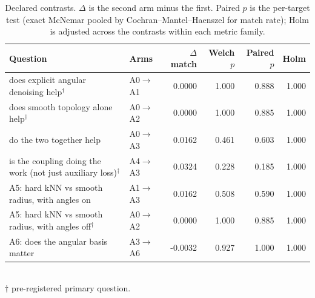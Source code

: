 \begin{table}[htbp]
\centering
\small
\caption{Declared contrasts. $\Delta$ is the second arm minus the first. Paired $p$ is the per-target test (exact McNemar pooled by Cochran--Mantel--Haenszel for match rate); Holm is adjusted across the contrasts within each metric family.}
\begin{tabular}{llrrrr}
\toprule
Question & Arms & $\Delta$ match & Welch $p$ & Paired $p$ & Holm \\
\midrule
does explicit angular denoising help$^{\dagger}$ & A0$\to$A1 & 0.0000 & 1.000 & 0.888 & 1.000 \\
does smooth topology alone help$^{\dagger}$ & A0$\to$A2 & 0.0000 & 1.000 & 0.885 & 1.000 \\
do the two together help & A0$\to$A3 & 0.0162 & 0.461 & 0.603 & 1.000 \\
is the coupling doing the work (not just auxiliary loss)$^{\dagger}$ & A4$\to$A3 & 0.0324 & 0.228 & 0.185 & 1.000 \\
A5: hard kNN vs smooth radius, with angles on & A1$\to$A3 & 0.0162 & 0.508 & 0.590 & 1.000 \\
A5: hard kNN vs smooth radius, with angles off$^{\dagger}$ & A0$\to$A2 & 0.0000 & 1.000 & 0.885 & 1.000 \\
A6: does the angular basis matter & A3$\to$A6 & -0.0032 & 0.927 & 1.000 & 1.000 \\
\bottomrule
\end{tabular}
\\[2pt]\footnotesize $\dagger$ pre-registered primary question.
\end{table}
